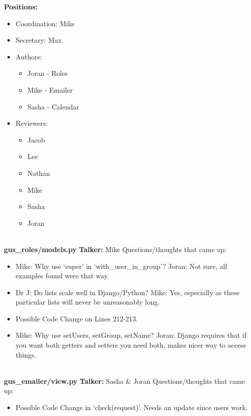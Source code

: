 \documentclass[12pt]{report}
\begin{document}
 \textbf{Positions:}
  \begin{itemize}
   \item Coordination: Mike
   \item Secretary: Max
   \item Authors:
   \begin{itemize}
    \item Joran - Roles
    \item Mike - Emailer
    \item Sasha - Calendar
   \end{itemize}
   \item Reviewers:
   \begin{itemize}
    \item Jacob
    \item Lee
    \item Nathan
    \item Mike
    \item Sasha
    \item Joran
   \end{itemize}
  \end{itemize}

 \textbf{\\[0.5pt] gus\_roles/models.py}\newline
 \textbf{Talker:} Mike\newline
 Questions/thoughts that came up:
 \begin{itemize}
  \item Mike: Why use `super' in `with\_user\_in\_group'?\newline 
           Joran: Not sure, all examples found were that way.
  \item Dr J: Do lists scale well in Django/Python?\newline
           Mike: Yes, especially as these particular lists will never be unreasonably long.
  \item Possible Code Change on Lines 212-213.
  \item Mike: Why use setUsers, setGroup, setName?\newline
           Joran: Django requires that if you want both getters and setters you need both, makes nicer way to access things.
 \end{itemize}

 \textbf{\\[0.5pt] gus\_emailer/view.py}\newline
 \textbf{Talker:} Sasha \& Joran\newline
 Questions/thoughts that came up:
 \begin{itemize}
  \item Possible Code Change in `check(request)'. Needs an update since users work.
 \end{itemize}
\end{document}
